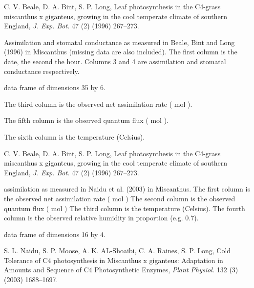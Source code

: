 \documentclass[letterpaper]{book}
\begin{document}
%
\begin{Source}\relax
C. V. Beale, D. A. Bint, S. P. Long, Leaf photosynthesis
in the C4-grass miscanthus x giganteus, growing in the
cool temperate climate of southern England, \emph{J. Exp.
Bot.} 47 (2) (1996) 267--273.
\end{Source}
%
\begin{Description}\relax
Assimilation and stomatal conductance as measured in
Beale, Bint and Long (1996) in Miscanthus (missing data
are also included).  The first column is the date, the
second the hour. Columns 3 and 4 are assimilation and
stomatal conductance respectively.
\end{Description}
%
\begin{Format}
data frame of dimensions 35 by 6.
\end{Format}
%
\begin{Details}\relax
The third column is the observed net assimilation rate
(\eqn{\mu}{} mol  ).

The fifth column is the observed quantum flux (\eqn{\mu}{}
mol  ).

The sixth column is the temperature (Celsius).
\end{Details}
%
\begin{Source}\relax
C. V. Beale, D. A. Bint, S. P. Long, Leaf photosynthesis
in the C4-grass miscanthus x giganteus, growing in the
cool temperate climate of southern England, \emph{J. Exp.
Bot.} 47 (2) (1996) 267--273.
\end{Source}
%
\begin{Description}\relax
assimilation as measured in Naidu et al. (2003) in
Miscanthus. The first column is the observed net
assimilation rate (\eqn{\mu}{} mol 
) The second column is the observed quantum
flux (\eqn{\mu}{} mol  ) The third
column is the temperature (Celsius). The fourth column is
the observed relative humidity in proportion (e.g. 0.7).
\end{Description}
%
\begin{Format}
data frame of dimensions 16 by 4.
\end{Format}
%
\begin{Source}\relax
S. L. Naidu, S. P. Moose, A. K. AL-Shoaibi, C. A. Raines,
S. P. Long, Cold Tolerance of C4 photosynthesis in
Miscanthus x giganteus: Adaptation in Amounts and
Sequence of C4 Photosynthetic Enzymes, \emph{Plant
Physiol.} 132 (3) (2003) 1688--1697.
\end{Source}
\end{document}
